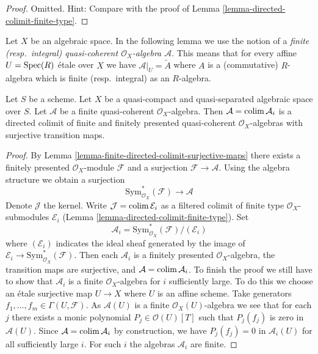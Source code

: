\begin{proof}
Omitted. Hint: Compare with the proof of
Lemma \ref{lemma-directed-colimit-finite-type}.
\end{proof}

\noindent
Let $X$ be an algebraic space. In the following lemma we use the notion
of a {\it finite (resp.\ integral) quasi-coherent
$\mathcal{O}_X$-algebra $\mathcal{A}$}. This means that for every
affine $U = \mathop{\mathrm{Spec}}(R)$ \'etale over $X$ we have
$\mathcal{A}|_U = \widetilde{A}$ where $A$ is a (commutative) $R$-algebra
which is finite (resp.\ integral) as an $R$-algebra.

\begin{lemma}
\label{lemma-finite-algebra-directed-colimit-finite-finitely-presented}
Let $S$ be a scheme. Let $X$ be a quasi-compact and quasi-separated
algebraic space over $S$. Let $\mathcal{A}$ be a finite quasi-coherent
$\mathcal{O}_X$-algebra. Then $\mathcal{A} = \mathop{\mathrm{colim}}\nolimits \mathcal{A}_i$
is a directed colimit of finite and finitely presented quasi-coherent
$\mathcal{O}_X$-algebras with surjective transition maps.
\end{lemma}

\begin{proof}
By Lemma \ref{lemma-finite-directed-colimit-surjective-maps}
there exists a finitely presented $\mathcal{O}_X$-module
$\mathcal{F}$ and a surjection $\mathcal{F} \to \mathcal{A}$.
Using the algebra structure we obtain a surjection
$$
\text{Sym}^*_{\mathcal{O}_X}(\mathcal{F}) \longrightarrow \mathcal{A}
$$
Denote $\mathcal{J}$ the kernel. Write $\mathcal{J} = \mathop{\mathrm{colim}}\nolimits \mathcal{E}_i$
as a filtered colimit of finite type $\mathcal{O}_X$-submodules
$\mathcal{E}_i$ (Lemma \ref{lemma-directed-colimit-finite-type}). Set
$$
\mathcal{A}_i = \text{Sym}^*_{\mathcal{O}_X}(\mathcal{F})/(\mathcal{E}_i)
$$
where $(\mathcal{E}_i)$ indicates the ideal sheaf generated by
the image of $\mathcal{E}_i \to \text{Sym}^*_{\mathcal{O}_X}(\mathcal{F})$.
Then each $\mathcal{A}_i$ is a finitely presented $\mathcal{O}_X$-algebra,
the transition maps are surjective, and $\mathcal{A} = \mathop{\mathrm{colim}}\nolimits \mathcal{A}_i$.
To finish the proof we still
have to show that $\mathcal{A}_i$ is a finite $\mathcal{O}_X$-algebra
for $i$ sufficiently large. To do this we choose an \'etale surjective
map $U \to X$ where $U$ is an affine scheme. Take generators
$f_1, \ldots, f_m \in \Gamma(U, \mathcal{F})$.
As $\mathcal{A}(U)$ is a finite $\mathcal{O}_X(U)$-algebra we
see that for each $j$ there exists a monic polynomial
$P_j \in \mathcal{O}(U)[T]$ such that $P_j(f_j)$ is zero in $\mathcal{A}(U)$.
Since $\mathcal{A} = \mathop{\mathrm{colim}}\nolimits \mathcal{A}_i$ by construction, we
have $P_j(f_j) = 0$ in $\mathcal{A}_i(U)$ for all sufficiently large $i$.
For such $i$ the algebras $\mathcal{A}_i$ are finite.
\end{proof}

